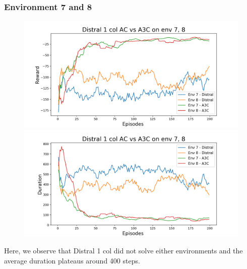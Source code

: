 \documentclass[12pt]{report}
\begin{document}
\subsubsection{Environment 7 and 8}
\begin{figure}[H]
\centering
\begin{minipage}{.5\textwidth}
\centering
\includegraphics[width=\textwidth]{figs/d1_col_ac/d1_col_ac_7_8_rwd.png}
\end{minipage}%
\centering
\begin{minipage}{.5\textwidth}
\centering
\includegraphics[width=\textwidth]{figs/d1_col_ac/d1_col_ac_7_8_dur.png}
\end{minipage}%
\end{figure}
Here, we observe that Distral 1 col did not solve either environments and the average duration plateaus around 400 steps.
\end{document}
